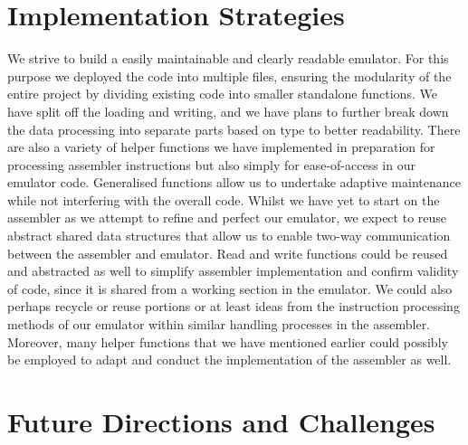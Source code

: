 \documentclass[11pt]{article}
\begin{document}
\section{Implementation Strategies}

We strive to build a easily maintainable and clearly readable emulator. For this purpose we deployed the code into multiple files, ensuring the modularity of the entire project by dividing existing code into smaller standalone functions. We have split off the loading and writing, and we have plans to further break down the data processing into separate parts based on type to better readability. There are also a variety of helper functions we have implemented in preparation for processing assembler instructions but also simply for ease-of-access in our emulator code. \newline \indent Generalised functions allow us to undertake adaptive maintenance while not interfering with the overall code. Whilst we have yet to start on the assembler as we attempt to refine and perfect our emulator, we expect to reuse abstract shared data structures that allow us to enable two-way communication between the assembler and emulator. Read and write functions could be reused and abstracted as well to simplify assembler implementation and confirm validity of code, since it is shared from a working section in the emulator. We could also perhaps recycle or reuse portions or at least ideas from the instruction processing methods of our emulator within similar handling processes in the assembler. Moreover, many helper functions that we have mentioned earlier could possibly be employed to adapt and conduct the implementation of the assembler as well.

\section{Future Directions and Challenges}
\end{document}
